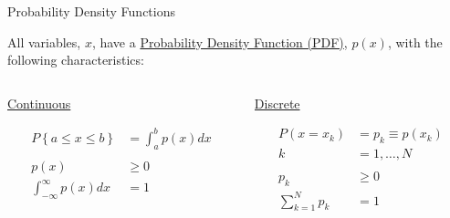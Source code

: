 \documentclass[xcolor=x11names,compress]{beamer}
\renewcommand{\(}{\begin{columns}}
\renewcommand{\)}{\end{columns}}
\newcommand{\<}[1]{\begin{column}{#1}}
\renewcommand{\>}{\end{column}}
\begin{document}
\begin{frame}{Probability Density Functions}

All variables, $x$, have a \underline{Probability Density Function (PDF)}, $p(x)$, with the following characteristics:

\begin{columns}
  \begin{column}{0.5\textwidth}
    \begin{center}
    \textcolor{berkeleygold}{\underline{Continuous}} 
    \end{center}
    \begin{align*}
    P\left\lbrace a \leq x \leq b \right\rbrace &= \int_a^b p(x)dx\\
    & \\
    p(x) & \geq 0 \\
    \int_{-\infty}^{\infty} p(x)dx &= 1
    \end{align*}
  \end{column}
  \begin{column}{0.5\textwidth}
    \begin{center}
    \textcolor{berkeleyblue}{\underline{Discrete}}  
    \end{center}
    \begin{align*}
    P(x = x_k) &= p_k \equiv p(x_k)\\
    k &= 1, \dots, N \\
    & \\
    p_k & \geq 0 \\
    \sum_{k=1}^N p_k &= 1
    \end{align*}
  \end{column}
\end{columns}

\end{frame}
\end{document}

